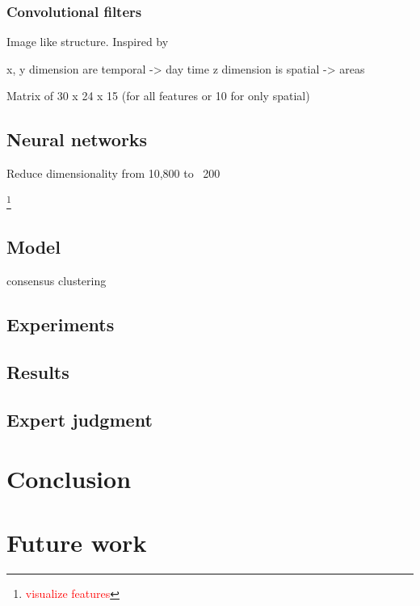 \documentclass{article}
\newcommand{\selfnote}[1]{\footnote{\textcolor{red}{#1}}}
\begin{document}
\subsubsection{Convolutional filters}
Image like structure. Inspired by \cite{langlois2016inferring}

x, y dimension are temporal -> day time
z dimension is spatial -> areas 

Matrix of 30 x 24 x 15 (for all features or 10 for only spatial)

\subsection{Neural networks}
Reduce dimensionality from 10,800 to ~200

\selfnote{visualize features}

\subsection{Model}
consensus clustering

\subsection{Experiments}

\subsection{Results}

\subsection{Expert judgment}


\newpage
\section{Conclusion}


\newpage
\section{Future work}

\newpage
{}

\end{document}
